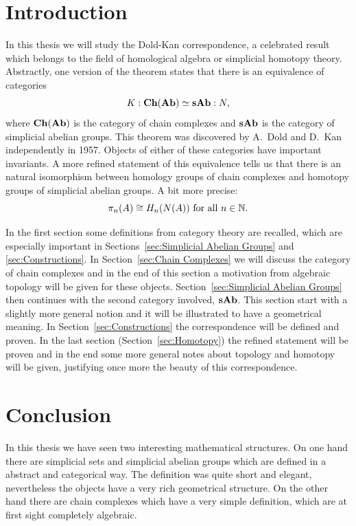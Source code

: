 \documentclass[titlepage, 11pt]{amsproc}
\theoremstyle{plain}
\theoremstyle{definition}
\begin{document}
\section*{Introduction}
In this thesis we will study the Dold-Kan correspondence, a celebrated result which belongs to the field of homological algebra or simplicial homotopy theory. Abstractly, one version of the theorem states that there is an equivalence of categories
$$ K: \mathbf{Ch}(\mathbf{Ab}) \simeq \mathbf{sAb} :N, $$
where $\mathbf{Ch}(\mathbf{Ab})$ is the category of chain complexes and $\mathbf{sAb}$ is the category of simplicial abelian groups. This theorem was discovered by A.~Dold \cite{dold} and D.~Kan \cite{kan} independently in 1957. Objects of either of these categories have important invariants. A more refined statement of this equivalence tells us that there is an natural isomorphism between homology groups of chain complexes and homotopy groups of simplicial abelian groups. A bit more precise:
$$ \pi_n(A) \cong H_n(N(A)) \text{ for all } n \in \mathbb{N}. $$

In the first section some definitions from category theory are recalled, which are especially important in Sections~\ref{sec:Simplicial Abelian Groups} and \ref{sec:Constructions}. In Section~\ref{sec:Chain Complexes} we will discuss the category of chain complexes and in the end of this section a motivation from algebraic topology will be given for these objects. Section~\ref{sec:Simplicial Abelian Groups} then continues with the second category involved, $\mathbf{sAb}$. This section start with a slightly more general notion and it will be illustrated to have a geometrical meaning. In Section~\ref{sec:Constructions} the correspondence will be defined and proven. In the last section (Section~\ref{sec:Homotopy}) the refined statement will be proven and in the end some more general notes about topology and homotopy will be given, justifying once more the beauty of this correspondence.

\newpage


\newpage


\newpage


\newpage


\newpage


\newpage
\section*{Conclusion}
In this thesis we have seen two interesting mathematical structures. On one hand there are simplicial sets and simplicial abelian groups which are defined in a abstract and categorical way. The definition was quite short and elegant, nevertheless the objects have a very rich geometrical structure. On the other hand there are chain complexes which have a very simple definition, which are at first sight completely algebraic.
\end{document}
